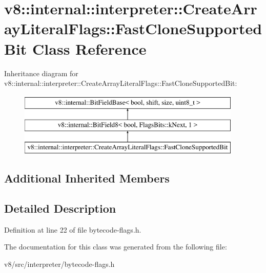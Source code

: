 \hypertarget{classv8_1_1internal_1_1interpreter_1_1CreateArrayLiteralFlags_1_1FastCloneSupportedBit}{}\section{v8\+:\+:internal\+:\+:interpreter\+:\+:Create\+Array\+Literal\+Flags\+:\+:Fast\+Clone\+Supported\+Bit Class Reference}
\label{classv8_1_1internal_1_1interpreter_1_1CreateArrayLiteralFlags_1_1FastCloneSupportedBit}
Inheritance diagram for v8\+:\+:internal\+:\+:interpreter\+:\+:Create\+Array\+Literal\+Flags\+:\+:Fast\+Clone\+Supported\+Bit\+:\begin{figure}[H]
\begin{center}
\leavevmode
\includegraphics[height=3.000000cm]{classv8_1_1internal_1_1interpreter_1_1CreateArrayLiteralFlags_1_1FastCloneSupportedBit}
\end{center}
\end{figure}
\subsection*{Additional Inherited Members}


\subsection{Detailed Description}


Definition at line 22 of file bytecode-\/flags.\+h.



The documentation for this class was generated from the following file\+:\begin{DoxyCompactItemize}
\item 
v8/src/interpreter/bytecode-\/flags.\+h\end{DoxyCompactItemize}
